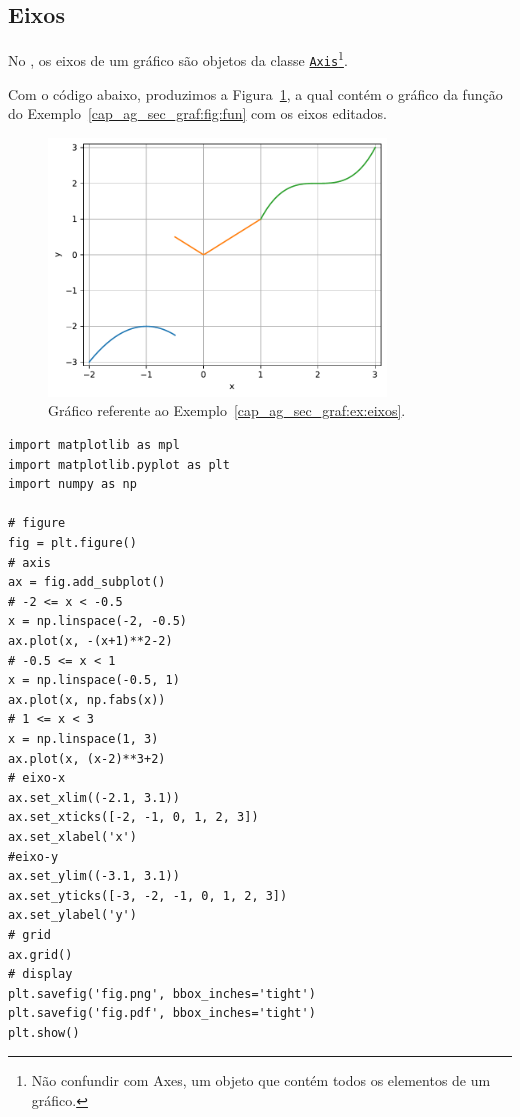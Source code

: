 \subsection{Eixos}

No {\matplotlib}, os eixos de um gráfico são objetos da classe \href{https://matplotlib.org/stable/api/axis_api.html#matplotlib.axis.Axis}{\lstinline+Axis+}\footnote{Não confundir com Axes, um objeto que contém todos os elementos de um gráfico.}.

\begin{ex}\label{cap_ag_sec_graf:ex:axis}
  Com o código abaixo, produzimos a Figura~\ref{cap_ag_sec_graf:fig:eixos}, a qual contém o gráfico da função do Exemplo~\ref{cap_ag_sec_graf:fig:fun} com os eixos editados.

  \begin{figure}[H]
    \centering
    \includegraphics[width=0.8\textwidth]{./cap_ag/dados/fig_eixos/fig}
    \caption{Gráfico referente ao Exemplo~\ref{cap_ag_sec_graf:ex:eixos}.}
    \label{cap_ag_sec_graf:fig:eixos}
  \end{figure}  

\begin{lstlisting}
import matplotlib as mpl
import matplotlib.pyplot as plt
import numpy as np

# figure
fig = plt.figure()
# axis
ax = fig.add_subplot()
# -2 <= x < -0.5
x = np.linspace(-2, -0.5)
ax.plot(x, -(x+1)**2-2)
# -0.5 <= x < 1
x = np.linspace(-0.5, 1)
ax.plot(x, np.fabs(x))
# 1 <= x < 3
x = np.linspace(1, 3)
ax.plot(x, (x-2)**3+2)
# eixo-x
ax.set_xlim((-2.1, 3.1))
ax.set_xticks([-2, -1, 0, 1, 2, 3])
ax.set_xlabel('x')
#eixo-y
ax.set_ylim((-3.1, 3.1))
ax.set_yticks([-3, -2, -1, 0, 1, 2, 3])
ax.set_ylabel('y')
# grid
ax.grid()
# display
plt.savefig('fig.png', bbox_inches='tight')
plt.savefig('fig.pdf', bbox_inches='tight')
plt.show()
\end{lstlisting}

\end{ex}

